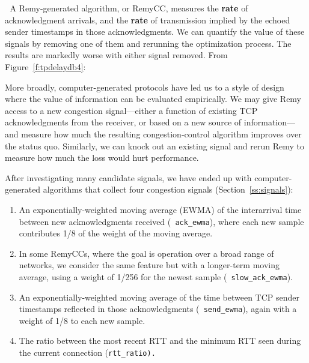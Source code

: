 \vspace{0.85 \baselineskip}
\enlargethispage{\baselineskip}

\noindent \begin{minipage}{\textwidth}

\textcolor{white}{.}\hspace{\parindent} A Remy-generated algorithm, or
RemyCC, measures the \textbf{rate} of acknowledgment arrivals, and the
\textbf{rate} of transmission implied by the echoed sender timestamps
in those acknowledgments. We can quantify the value of these signals
by removing one of them and rerunning the optimization process. The
results are markedly worse with either signal removed.  From
Figure~\ref{f:tpdelaydb4}:

\begin{center}
\def\svgwidth{0.8 \textwidth}\footnotesize
\end{center}
\end{minipage}

\newpage

More broadly, computer-generated protocols have led us to a style
of design where the value of information can be evaluated
empirically. We may give Remy access to a new congestion
signal---either a function of existing TCP acknowledgments from the
receiver, or based on a new source of information---and measure
how much the resulting congestion-control algorithm improves over the
status quo. Similarly, we can knock out an existing signal and rerun
Remy to measure how much the loss would hurt performance.

After investigating many candidate signals, we have ended up with
computer-generated algorithms that collect four congestion signals
(Section~\ref{ss:signals}):

\begin{enumerate}

\item An exponentially-weighted moving average (EWMA) of the
  interarrival time between new acknowledgments received ({\tt
    ack\_ewma}), where each new sample contributes 1/8 of the weight
  of the moving average.

\item In some RemyCCs, where the goal is operation over a broad range
  of networks, we consider the same feature but with a longer-term
  moving average, using a weight of 1/256 for the newest sample ({\tt
    slow\_ack\_ewma}).

\item An exponentially-weighted moving average of the time between TCP
  sender timestamps reflected in those acknowledgments ({\tt
    send\_ewma}), again with a weight of 1/8 to each new sample.

\item The ratio between the most recent RTT and the minimum RTT seen
  during the current connection (\tt{rtt\_ratio}).

\end{enumerate}

